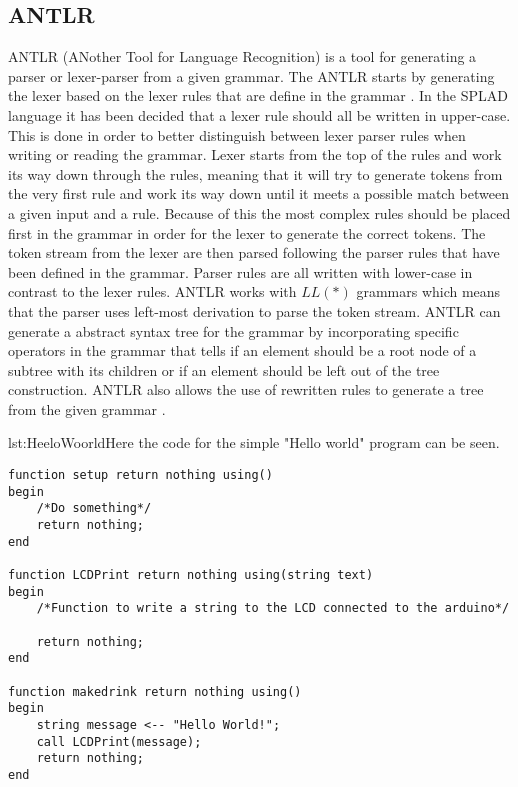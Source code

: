 \subsection{ANTLR}
ANTLR (ANother Tool for Language Recognition) is a tool for generating a parser or lexer-parser from a given grammar. The ANTLR starts by generating the lexer based on the lexer rules that are define in the grammar \citep{ANTLRLexer}. %
In the SPLAD language it has been decided that a lexer rule should all be written in upper-case. This is done in order to better distinguish between lexer parser rules when writing or reading the grammar. Lexer starts from the top of the rules and work its way down through the rules, meaning that it will try to generate tokens from the very first rule and work its way down until it meets a possible match between a given input and a rule. Because of this the most complex rules should be placed first in the grammar in order for the lexer to generate the correct tokens. 
The token stream from the lexer are then parsed following the parser rules that have been defined in the grammar. Parser rules are all written with lower-case in contrast to the lexer rules. ANTLR works with $LL(*)$ grammars which means that the parser uses left-most derivation to parse the token stream. ANTLR can generate a abstract syntax tree for the grammar by incorporating specific operators in the grammar that tells if an element should be a root node of a subtree with its children or if an element should be left out of the tree construction. ANTLR also allows the use of rewritten rules to generate a tree from the given grammar \citep{ANTLRTreeCon}.

\begin{code}{lst:HeeloWoorld}{Here the code for the simple "Hello world" program can be seen.}
\begin{lstlisting}
function setup return nothing using()
begin
	/*Do something*/
	return nothing;
end

function LCDPrint return nothing using(string text)
begin
	/*Function to write a string to the LCD connected to the arduino*/
		
	return nothing;
end

function makedrink return nothing using()
begin
	string message <-- "Hello World!";
	call LCDPrint(message);
	return nothing;
end
\end{lstlisting}
\end{code}

